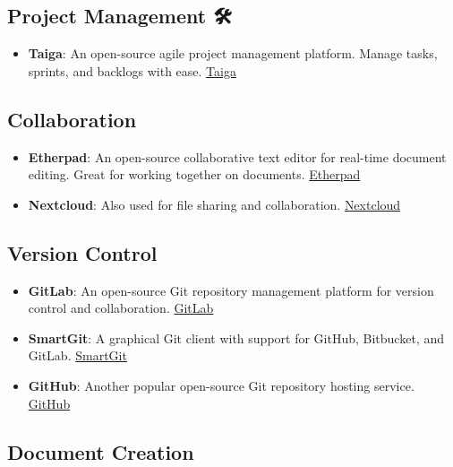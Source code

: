 \documentclass[
  letterpaper,
  DIV=11,
  numbers=noendperiod]{scrreprt}
\providecommand{\tightlist}{%
  \setlength{\itemsep}{0pt}\setlength{\parskip}{0pt}}\usepackage{longtable,booktabs,array}
\begin{document}
\subsection{Project Management 🛠️}\label{project-management}

\begin{itemize}
\tightlist
\item
  \textbf{Taiga}: An open-source agile project management platform.
  Manage tasks, sprints, and backlogs with ease.
  \href{https://www.taiga.io/}{Taiga}
\end{itemize}

\subsection{Collaboration 🤝}\label{collaboration}

\begin{itemize}
\item
  \textbf{Etherpad}: An open-source collaborative text editor for
  real-time document editing. Great for working together on documents.
  \href{https://etherpad.org/}{Etherpad}
\item
  \textbf{Nextcloud}: Also used for file sharing and collaboration.
  \href{https://nextcloud.com/}{Nextcloud}
\end{itemize}

\subsection{Version Control 🔄}\label{version-control}

\begin{itemize}
\item
  \textbf{GitLab}: An open-source Git repository management platform for
  version control and collaboration.
  \href{https://about.gitlab.com/}{GitLab}
\item
  \textbf{SmartGit}: A graphical Git client with support for GitHub,
  Bitbucket, and GitLab.
  \href{https://www.syntevo.com/smartgit/}{SmartGit}
\item
  \textbf{GitHub}: Another popular open-source Git repository hosting
  service. \href{https://github.com/}{GitHub}
\end{itemize}

\subsection{Document Creation 📄}\label{document-creation}
\end{document}
